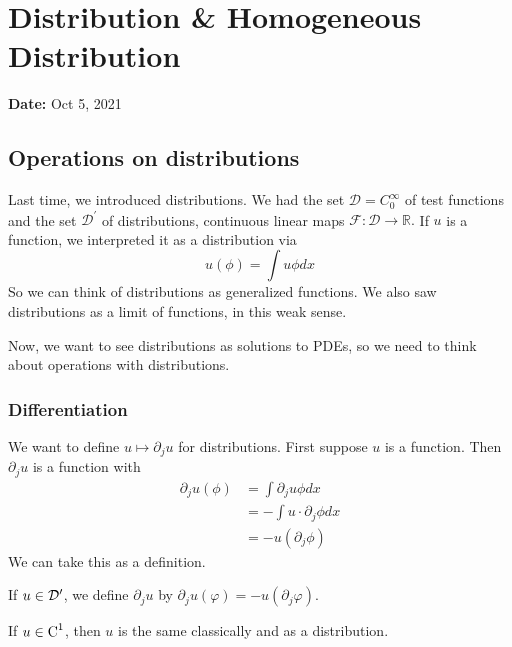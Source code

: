 \newpage
\section{Distribution \& Homogeneous Distribution}
\textbf{Date:} Oct 5, 2021
\subsection{Operations on distributions}

Last time, we introduced distributions. We had the set $\mathcal{D}=C_{0}^{\infty}$ of test functions and the set $\mathcal{D}^{\prime}$ of distributions, continuous linear maps $\mathcal{F}: \mathcal{D} \rightarrow \mathbb{R} .$ If $u$ is a function, we interpreted it as a distribution via
$$
u(\phi)=\int u \phi d x
$$
So we can think of distributions as generalized functions. We also saw distributions as a limit of functions, in this weak sense.

Now, we want to see distributions as solutions to PDEs, so we need to think about operations with distributions.

\subsubsection{Differentiation}
We want to define $u \mapsto \partial_{j} u$ for distributions. First suppose $u$ is a function. Then $\partial_{j} u$ is a function with
$$
\begin{aligned}
\partial_{j} u(\phi) &=\int \partial_{j} u \phi d x \\
&=-\int u \cdot \partial_{j} \phi d x \\
&=-u\left(\partial_{j} \phi\right)
\end{aligned}
$$
We can take this as a definition.

\begin{definition}
    If $u\in \mathcal{D}'$, we define $\partial_j u$ by $\partial_j u (\varphi) = -u (\partial_j \varphi)$.
\end{definition}
\begin{remark}
If $u\in \operatorname{C}^1$, then $u$ is the same classically and as a distribution.
\end{remark}

